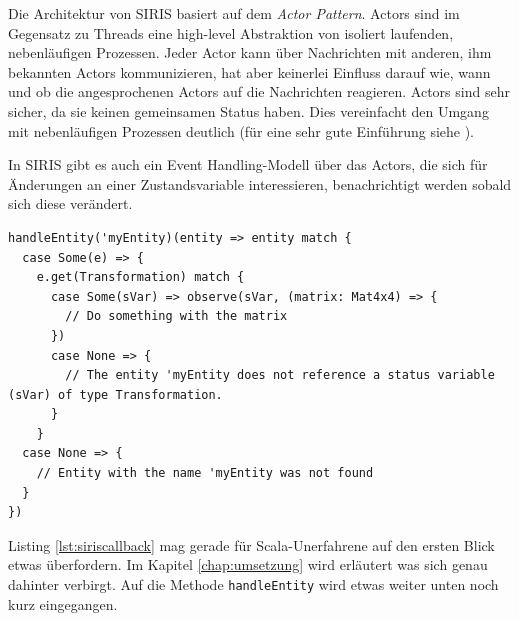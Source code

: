 Die Architektur von SIRIS basiert auf dem \textit{Actor Pattern}. Actors sind im Gegensatz zu Threads eine high-level Abstraktion von isoliert laufenden, nebenläufigen Prozessen. Jeder Actor kann über Nachrichten mit anderen, ihm bekannten Actors kommunizieren, hat aber keinerlei Einfluss darauf wie, wann und ob die angesprochenen Actors auf die Nachrichten reagieren. Actors sind sehr sicher, da sie keinen gemeinsamen Status haben. Dies vereinfacht den Umgang mit nebenläufigen Prozessen deutlich (für eine sehr gute Einführung siehe \autocite{ActorsInScala}).

In SIRIS gibt es auch ein Event Handling-Modell über das Actors, die sich für Änderungen an einer Zustandsvariable interessieren, benachrichtigt werden sobald sich diese verändert.
\lstset{language=Scala}
\begin{lstlisting}[caption={Registrieren einer Callbackfunktion zur Änderungsüberwachung einer Zustandsvariablen}, label={lst:siriscallback}]
handleEntity('myEntity)(entity => entity match {
  case Some(e) => {
    e.get(Transformation) match {
      case Some(sVar) => observe(sVar, (matrix: Mat4x4) => {
        // Do something with the matrix
      })
      case None => {
        // The entity 'myEntity does not reference a status variable (sVar) of type Transformation.
      }
    }
  case None => {
    // Entity with the name 'myEntity was not found
  }
})
\end{lstlisting}
Listing \ref{lst:siriscallback} mag gerade für Scala-Unerfahrene auf den ersten Blick etwas überfordern. Im Kapitel \ref{chap:umsetzung} wird erläutert was sich genau dahinter verbirgt. Auf die Methode \texttt{handleEntity} wird etwas weiter unten noch kurz eingegangen.

